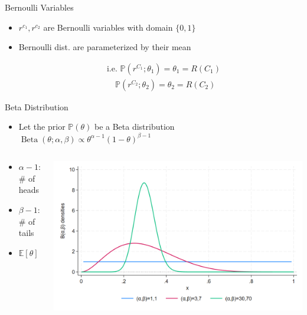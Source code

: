 \documentclass[11pt,table]{beamer}
\begin{document}
\begin{frame}{Bernoulli Variables}


    \begin{itemize}
        \item $r^{c_{1}}, r^{c_{2}}$ are Bernoulli variables with domain $\{0,1\}$

\item  Bernoulli dist. are parameterized by their mean

$$
\begin{aligned}
& \text {i.e. } \mathbb{P}\left(r^{C_{1}} ; \theta_{1}\right)=\theta_{1}=R\left(C_{1}\right) \\
& \quad \mathbb{P}\left(r^{C_{2}} ; \theta_{2}\right)=\theta_{2}=R\left(C_{2}\right)
\end{aligned}
$$ 
    \end{itemize}
\end{frame}

\begin{frame}{Beta Distribution}


    \begin{itemize}
        \item  Let the prior $\mathbb{P}(\theta)$ be a Beta distribution $\operatorname{Beta}(\theta; \alpha, \beta) \propto \theta^{\alpha-1}(1-\theta)^{\beta-1}$
    \end{itemize}
    \begin{columns}[T]
\begin{column}{0.4\textwidth}
\begin{itemize}
    \item  $\alpha-1$: \# of heads

\item  $\beta-1$: \# of tails

\item  $\mathbb{E}[\theta]=\alpha /(\alpha+\beta)$

\end{itemize}
\end{column}
\begin{column}{0.6\textwidth}
\centering
\includegraphics[width=1\textwidth]{figures/3.png}
\end{column}
\end{columns}
\end{frame}
\end{document}
